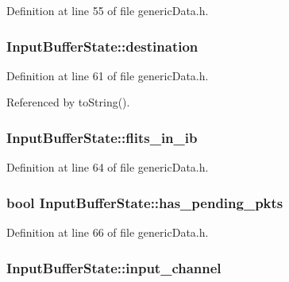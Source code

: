 Definition at line 55 of file genericData.h.
\subsubsection[{destination}]{ {\bf InputBufferState::destination}}\label{classInputBufferState_ff098af304cc3c2f6f598cbb58354809}




Definition at line 61 of file genericData.h.

Referenced by toString().
\subsubsection[{flits\_\-in\_\-ib}]{ {\bf InputBufferState::flits\_\-in\_\-ib}}\label{classInputBufferState_7bb6e699d08a986ff814df06fd03158f}




Definition at line 64 of file genericData.h.
\subsubsection[{has\_\-pending\_\-pkts}]{\setlength{\rightskip}{0pt plus 5cm}bool {\bf InputBufferState::has\_\-pending\_\-pkts}}\label{classInputBufferState_a2d9cad4e201c9f440f67c3ad2190c21}




Definition at line 66 of file genericData.h.
\subsubsection[{input\_\-channel}]{ {\bf InputBufferState::input\_\-channel}}\label{classInputBufferState_925fc897dfe17d2ebb290784654f7d3f}




